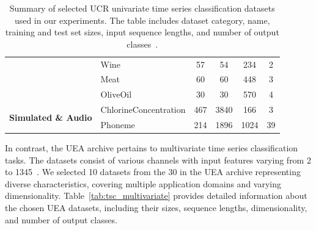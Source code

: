 \begin{table}[h!]
\begin{adjustbox}{max width=\textwidth}
\begin{tabular}{llcccc}
& Wine & 57 & 54 & 234 & 2  \\
& Meat & 60 & 60 & 448 & 3 \\
& OliveOil & 30 & 30 & 570 & 4  \\
\midrule
\multirow{2}{*}{\textbf{Simulated \& Audio}} 
& ChlorineConcentration & 467 & 3840 & 166 & 3 \\
& Phoneme & 214 & 1896 & 1024 & 39 \\
\bottomrule
\end{tabular}
\end{adjustbox}
\caption{Summary of selected UCR univariate time series classification datasets used in our experiments. The table includes dataset category, name, training and test set sizes, input sequence lengths, and number of output classes~\cite{UCRArchive2018}.}
\label{tab:tsc_datasets}
\end{table}

In contrast, the UEA archive pertains to multivariate time series classification tasks. The datasets consist of various channels with input features varying from 2 to 1345~\cite{bagnall2018ueamultivariatetimeseries}. We selected 10 datasets from the 30 in the UEA archive representing diverse characteristics, covering multiple application domains and varying dimensionality. Table~\ref{tab:tsc_multivariate} provides detailed information about the chosen UEA datasets, including their sizes, sequence lengths, dimensionality, and number of output classes.





